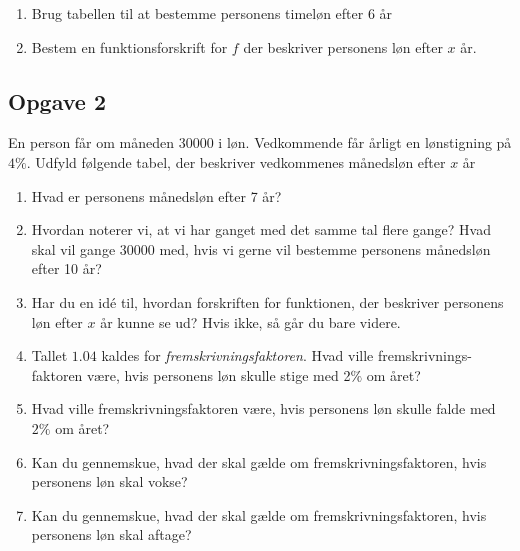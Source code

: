\begin{enumerate}[label=\roman*)]
	\item Brug tabellen til at bestemme personens timeløn efter 6 år
	\item Bestem en funktionsforskrift for $f$ der beskriver personens løn efter $x$ år.
\end{enumerate}

\subsection*{Opgave 2}

En person får om måneden 30000 i løn. Vedkommende får årligt en lønstigning på $4\%$. Udfyld følgende tabel, der beskriver vedkommenes månedsløn efter $x$ år

\begin{center}
\end{center}

\begin{enumerate}[label = \roman*)]
	\item Hvad er personens månedsløn efter 7 år?
	\item Hvordan noterer vi, at vi har ganget med det samme tal flere gange? Hvad skal vil 
	gange $30000$ med, hvis vi gerne vil bestemme personens månedsløn efter 10 år?
	\item Har du en idé til, hvordan forskriften for funktionen, der beskriver
	personens løn efter $x$ år kunne se ud? Hvis ikke, så går du bare videre. 
	\item Tallet $1.04$ kaldes for \textit{fremskrivningsfaktoren}. Hvad ville fremskrivnings-
	faktoren være, hvis personens løn skulle stige med 2$\%$ om året?
	\item Hvad ville fremskrivningsfaktoren være, hvis personens løn skulle falde med $2\%$ om 
	året?
	\item Kan du gennemskue, hvad der skal gælde om fremskrivningsfaktoren, hvis personens løn 
	skal vokse? 
	\item Kan du gennemskue, hvad der skal gælde om fremskrivningsfaktoren, hvis personens løn 
	skal aftage?
\end{enumerate}

